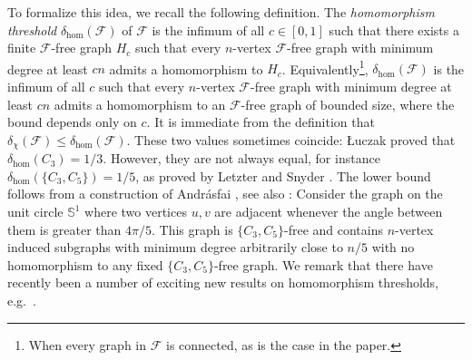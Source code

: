 \documentclass{article}
\begin{document}
To formalize this idea, we recall the following definition.
The \emph{homomorphism threshold} $\delta_{\hom}(\mathcal{F})$ of $\mathcal{F}$ is the infimum of all $c \in [0, 1]$ such that there exists a finite $\mathcal{F}$-free graph $H_c$ such that every $n$-vertex $\mathcal{F}$-free graph with minimum degree at least $cn$ admits a homomorphism to $H_c$.
Equivalently\footnote{When every graph in $\mathcal{F}$ is connected, as is the case in the paper.}, $\delta_{\hom}(\mathcal{F})$ is the infimum of all $c$ such that every  $n$-vertex $\mathcal{F}$-free graph with minimum degree at least $cn$ admits a homomorphism to an $\mathcal{F}$-free graph of bounded size, where the bound depends only on $c$.
It is immediate from the definition that $\delta_{\chi}(\mathcal{F}) \leq \delta_{\hom}(\mathcal{F})$.
These two values sometimes coincide: Łuczak \cite{L06} proved that $\delta_{\hom}(C_3) = 1/3$.
However, they are not always equal, for instance $\delta_{\hom}(\{C_3, C_5\}) = 1/5$, as proved by Letzter and Snyder \cite{LS18}.
The lower bound follows from a construction of Andr\'{a}sfai \cite{A62,A64}, see also \cite{E57}: Consider the graph on the unit circle $\mathbb S^1$ where two vertices $u,v$ are adjacent whenever the angle between them is greater than $4\pi/5$. This graph is $\{C_3, C_5\}$-free and contains $n$-vertex induced subgraphs with minimum degree arbitrarily close to $n/5$ with no homomorphism to any fixed $\{C_3, C_5\}$-free graph.
We remark that there have recently been a number of exciting new results on homomorphism thresholds, e.g.\ \cite{HRS26,gishboliner2026homomorphismvcdimensionthresholdsspectra,HLZH26,Sankar,WWX26}.
\end{document}
